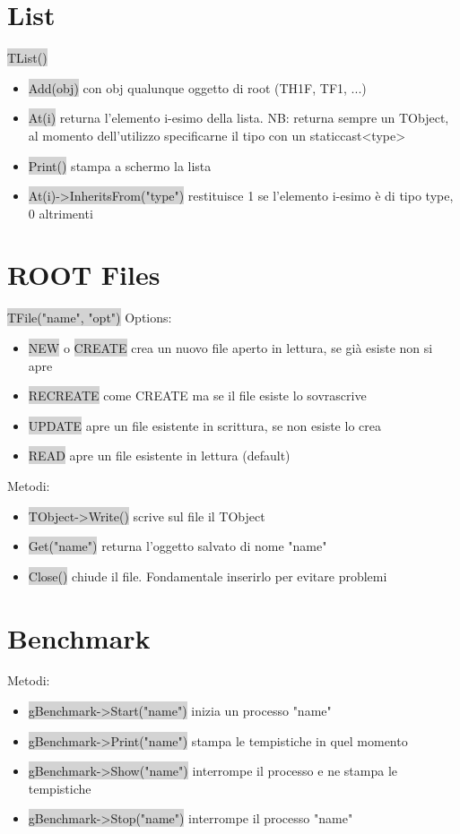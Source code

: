 \documentclass[a4paper]{article}
\begin{document}
\section{List}
    \colorbox{LightGray}{TList()}\\
    \begin{itemize}
        \item \colorbox{LightGray}{Add(obj)} con obj qualunque oggetto di root (TH1F, TF1, ...)
        \item \colorbox{LightGray}{At(i)} returna l'elemento i-esimo della lista. NB: returna sempre un TObject, al momento dell'utilizzo specificarne il tipo con un static\textunderscore cast<type>
        \item \colorbox{LightGray}{Print()} stampa a schermo la lista
        \item \colorbox{LightGray}{At(i)->InheritsFrom("type")} restituisce 1 se l'elemento i-esimo è di tipo type, 0 altrimenti
    \end{itemize}
\section{ROOT Files}
    \colorbox{LightGray}{TFile("name", "opt")}
    Options:
    \begin{itemize}
        \item \colorbox{LightGray}{NEW} o \colorbox{LightGray}{CREATE} crea un nuovo file aperto in lettura, se già esiste non si apre
        \item \colorbox{LightGray}{RECREATE} come CREATE ma se il file esiste lo sovrascrive
        \item \colorbox{LightGray}{UPDATE} apre un file esistente in scrittura, se non esiste lo crea
        \item \colorbox{LightGray}{READ} apre un file esistente in lettura (default)
    \end{itemize}
    Metodi:
    \begin{itemize}
        \item \colorbox{LightGray}{TObject->Write()} scrive sul file il TObject
        \item \colorbox{LightGray}{Get("name")} returna l'oggetto salvato di nome "name"
        \item \colorbox{LightGray}{Close()} chiude il file. Fondamentale inserirlo per evitare problemi
    \end{itemize}
\section{Benchmark}
    Metodi:
    \begin{itemize}
        \item \colorbox{LightGray}{gBenchmark->Start("name")} inizia un processo "name"
        \item \colorbox{LightGray}{gBenchmark->Print("name")} stampa le tempistiche in quel momento
        \item \colorbox{LightGray}{gBenchmark->Show("name")} interrompe il processo e ne stampa le tempistiche
        \item \colorbox{LightGray}{gBenchmark->Stop("name")} interrompe il processo "name"
    \end{itemize}
\end{document}
